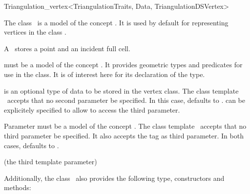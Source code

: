 \begin{ccRefClass}{Triangulation_vertex<TriangulationTraits, Data, TriangulationDSVertex>}

\ccDefinition

The class \ccRefName\ is a model of the concept . It is
used by default for representing vertices in the class
.

A \ccRefName\ stores a point and an incident full cell.


\ccParameters

 must be a model of the concept . It
provides geometric types and predicates for use in the
 class. It is of interest here for its
declaration of the  type.

 is an optional type of data to be stored in the vertex class. The
class template \ccRefName\ accepts that no second parameter be specified. In
this case,  defaults to .
 can be explicitely specified to allow to access the
third parameter.

Parameter 
 must be a model of the concept . The
class template \ccRefName\ accepts that no third parameter be specified. It
also accepts the tag  as third parameter. In both cases,
 defaults to .

\ccInheritsFrom

 (the third template parameter)

\ccIsModel


Additionally, the class \ccRefName\ also provides the following type,
constructors and methods:

\ccTypes


\ccCreation
{}



\end{ccRefClass}
